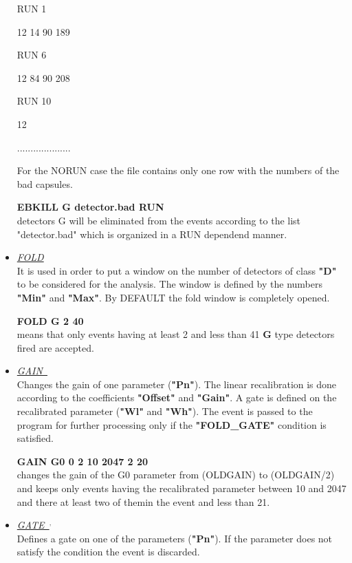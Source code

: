 \begin{itemize}
	\hskip1cm RUN  1

	\hskip1cm 12 14 90 189

	\hskip1cm RUN  6

	\hskip1cm 12 84 90 208

	\hskip1cm RUN 10

	\hskip1cm 12 

	\hskip1cm ....................

	For the NORUN case the file contains only one row with the numbers of
	the bad capsules.
	
	\hskip1cm {\bf EBKILL G detector.bad RUN}\\ 
	detectors G will be eliminated from the events according to the list 
	"detector.bad" which is organized in a RUN dependend manner.

 \item	{\it\underline{FOLD}} \\

        It is used in order to put a window on the number of detectors
	of class {\bf "D"} 
	to be considered for the analysis. The window is defined by the
	numbers {\bf "Min"} and {\bf "Max"}. By DEFAULT the fold window is
	completely opened. 
	
	\hskip1cm {\bf FOLD G 2 40}\\ 
	means that only events having at least 2 and less than 41 {\bf G} 
	type detectors fired are accepted.

 \item	{\it\underline{GAIN~}}\footnotemark[2] \\

	Changes the gain of one parameter ({\bf "Pn"}). The linear
	recalibration is done according to the coefficients {\bf "Offset"}
 	and {\bf "Gain"}. A gate is defined on the recalibrated parameter
	({\bf "Wl"} and {\bf "Wh"}). The event is passed to the program 
	for further processing only if the {\bf "FOLD\_GATE"} condition is 
	satisfied. 

	\hskip1cm {\bf GAIN G0 0 2 10 2047 2 20}\\
	changes the gain of the G0 parameter from (OLDGAIN) to 
	(OLDGAIN/2) and keeps only events having the recalibrated parameter
	between 10 and 2047 and there at least two of themin the event and
	less than 21.  

 \item	{\it\underline{GATE~}}\footnotemark[2]$^,$\footnotemark[3] \\

	Defines a gate on one of the parameters ({\bf "Pn"}).
	If the parameter does not 
	satisfy the condition the event is discarded. 
  		    

\end{itemize}
